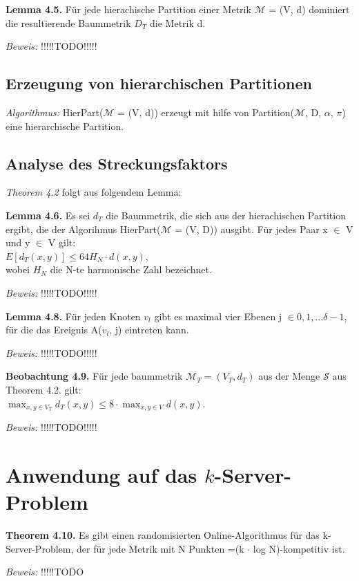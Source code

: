 \textbf{Lemma 4.5.} Für jede hierachische Partition einer Metrik $\mathcal{M}$ = (V, d) dominiert die resultierende Baummetrik $D_{T}$ die Metrik d.

\textit{Beweis:} !!!!!TODO!!!!!

\subsection{Erzeugung von hierarchischen Partitionen}

\textit{Algorithmus:} HierPart($\mathcal{M}$ = (V, d)) erzeugt mit hilfe von Partition($\mathcal{M}$, D, $\alpha$, $\pi$) eine hierarchische Partition.

\subsection{Analyse des Streckungsfaktors}

\textit{Theorem 4.2} folgt aus folgendem Lemma:

\textbf{Lemma 4.6.} Es sei $d_{T}$ die Baummetrik, die sich aus der hierachischen Partition ergibt, die der Algorihmus HierPart($\mathcal{M}$ = (V, D)) ausgibt. Für jedes Paar x $\in$ V und y $\in$ V gilt:\\
$E[d_{T}(x, y)] \le 64 H_{N} \cdot d(x, y)$, \\
wobei $H_{N}$ die N-te harmonische Zahl bezeichnet.

\textit{Beweis:} !!!!!TODO!!!!!

\textbf{Lemma 4.8.} Für jeden Knoten $v_{l}$ gibt es maximal vier Ebenen j $\in {0, 1, ... \delta - 1}$, für die das Ereignis A($v_{l}$, j) eintreten kann.

\textit{Beweis:} !!!!!TODO!!!!!

\textbf{Beobachtung 4.9.} Für jede baummetrik $\mathcal{M}_{T} = (V_{T}, d_{T})$ aus der Menge $\mathcal{S}$ aus Theorem 4.2. gilt: \\
$\max_{x, y \in V_{T}} d_{T}(x, y) \le 8 \cdot \max_{x, y \in V} d(x, y)$.

\textit{Beweis:} !!!!!TODO!!!!!

\section{Anwendung auf das $k$-Server-Problem}


\textbf{Theorem 4.10.} Es gibt einen randomisierten Online-Algorithmus für das k-Server-Problem, der für jede Metrik mit N Punkten =(k $\cdot$ log N)-kompetitiv ist.

\textit{Beweis:} !!!!!TODO